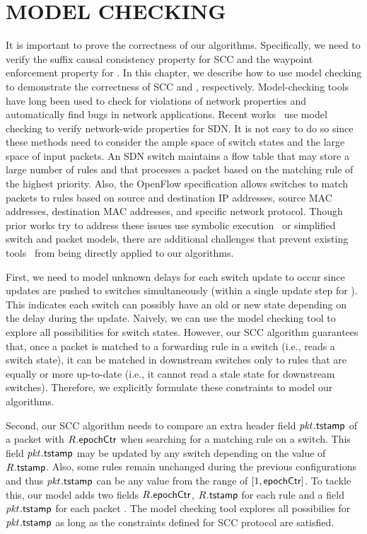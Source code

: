 
\chapter{\uppercase{Model Checking}}
\label{chap:modelchecking}
\graphicspath{{./}{./fig/}{./fig/nimble/}}

It is important to prove the correctness of our algorithms. Specifically, we need to verify the suffix causal consistency property for SCC and the waypoint enforcement property for \sysname. In this chapter, we describe how to use model checking to demonstrate the correctness of SCC and \sysname, respectively. Model-checking tools have long been used to check for violations of network properties and automatically find bugs in network applications.  Recent works~\cite{mcopenflow, flowchecker, nice} use model checking to verify network-wide properties for SDN. It is not easy to do so since these methods need to consider the ample space of switch states and the large space of input packets. An SDN switch maintains a flow table that may store a large number of rules and that processes a packet based on the matching rule of the highest priority. Also, the OpenFlow specification allows switches to match packets to rules based on source and destination IP addresses, source MAC addresses, destination MAC addresses, and specific network protocol.  Though prior works try to address these issues use symbolic execution~\cite{symbolic} or simplified switch and packet models, there are additional challenges that prevent existing tools~\cite{mcopenflow, flowchecker, netplumber, hsa, sdnracer, nice, atpg, veriflow} from being directly applied to our algorithms.
 

First, we need to model unknown delays for each switch update to occur since updates are pushed to switches simultaneously (within a single update step for \sysname). This indicates each switch can possibly have an old or new state depending on the delay during the update. Naively, we can use the model checking tool to explore all possibilities for switch states. However, our SCC algorithm guarantees that, once a packet is matched to a forwarding rule in a switch (i.e., reads a switch state), it can be matched in downstream switches only to rules that are equally or more up-to-date (i.e., it cannot read a stale state for downstream switches). Therefore, we explicitly formulate these constraints to model our algorithms. 

Second, our SCC algorithm needs to compare an extra header field $\pktID{}{\tagTmpField}$ of a packet with $\ruleID{}{\epochField}$ when searching for a matching rule on a switch. This field $\pktID{}{\tagTmpField}$ may be updated by any switch depending on the value of $\ruleID{}{\tagTmpField}$. Also, some rules remain unchanged during the previous configurations and thus $\pktID{}{\tagTmpField}$ can be any value from the range of $[1, \mathsf{epochCtr}]$. To tackle this, our model adds two fields $\ruleID{}{\epochField}$, $\ruleID{}{\tagTmpField}$ for each rule  and a field $\pktID{}{\tagTmpField}$ for each packet \pktID{}. The model checking tool explores all possibilies for $\pktID{}{\tagTmpField}$ as long as the constraints defined for SCC protocol are satisfied.

